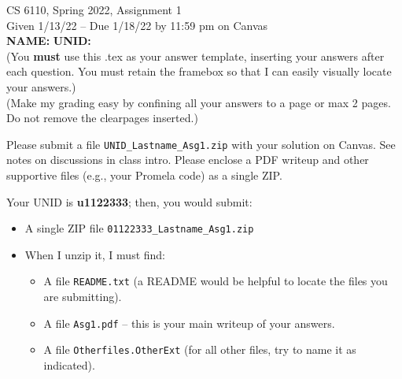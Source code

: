 \documentclass[11pt]{article}
\begin{document}



\begin{center}
\begin{large}
  CS 6110, Spring 2022, Assignment 1  \\
  Given 1/13/22 -- Due 1/18/22 by 11:59 pm on Canvas
  \ \\
    {  {\Large\bf NAME: } \hfill {\Large\bf UNID: }\hspace{4cm} }
          \ \\
          (You {\bf must} use this .tex as your answer template, inserting your answers
          after each question. You must retain the framebox so that I can easily visually
          locate your answers.)
          \ \\
          (Make my grading easy by confining all your answers to a page or max 2 pages.
          Do not remove the clearpages inserted.)
  \ \\      
\end{large}


\end{center}
\date{}


 Please submit a file
\verb|UNID_Lastname_Asg1.zip| with your solution on Canvas.
%
See notes on discussions in class intro.
%
Please enclose a PDF writeup and other supportive files (e.g.,
your Promela code) as a single ZIP.

 Your UNID is {\bf u1122333}; then, you
would submit:
%
\begin{itemize}
\item A single ZIP file \verb|01122333_Lastname_Asg1.zip|
\item When I unzip it, I must find:
  \begin{itemize}
  \item A file \verb|README.txt| (a README would be helpful
    to locate the files you are submitting).
  \item A file \verb|Asg1.pdf| -- this is your main writeup
    of your answers.
  \item A file \verb|Otherfiles.OtherExt| (for all other files,
    try to name it as indicated).
  \end{itemize}
\end{itemize}
\end{document}
